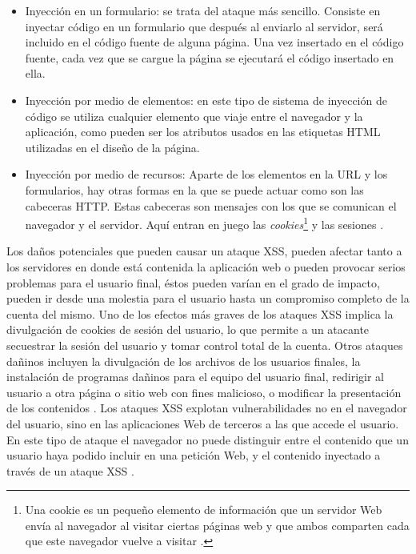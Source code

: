 \begin{itemize}
	\item Inyección en un formulario: se trata del ataque más sencillo. Consiste en inyectar código en un formulario que después al
enviarlo al servidor, será incluido en el código fuente de alguna página. Una vez insertado en el código fuente, cada vez
que se cargue la página se ejecutará el código insertado en ella.

	\item Inyección por medio de elementos: en este tipo de sistema de inyección de código se utiliza cualquier elemento que viaje
entre el navegador y la aplicación, como pueden ser los atributos usados en las etiquetas HTML utilizadas en el diseño de
la página.

	\item Inyección por medio de recursos: Aparte de los elementos en la URL y los formularios, hay otras formas en la que se
puede actuar como son las cabeceras HTTP. Estas cabeceras son mensajes con los que se comunican el navegador y el
servidor. Aquí entran en juego las \textit{cookies}\footnote{Una cookie es un pequeño elemento de información que un servidor Web envía al navegador al visitar ciertas páginas web y que ambos comparten cada que este navegador vuelve a visitar \cite{cookie}.} y las sesiones \cite{ocho}.\\
\end{itemize}

Los daños potenciales que pueden causar un ataque XSS, pueden afectar tanto a los servidores en donde está contenida la
aplicación web o pueden provocar serios problemas para el usuario final, éstos pueden varían en el grado de impacto, pueden ir
desde una molestia para el usuario hasta un compromiso completo de la cuenta del mismo. Uno de los efectos más graves de los
ataques XSS implica la divulgación de cookies de sesión del usuario, lo que permite a un atacante secuestrar la sesión del usuario y
tomar control total de la cuenta. Otros ataques dañinos incluyen la divulgación de los archivos de los usuarios finales, la instalación
de programas dañinos para el equipo del usuario final, redirigir al usuario a otra página o sitio web con fines malicioso, o modificar
la presentación de los contenidos \cite{nueve}. Los ataques XSS explotan vulnerabilidades no en el navegador del usuario, sino en las
aplicaciones Web de terceros a las que accede el usuario. En este tipo de ataque el navegador no puede distinguir entre el contenido
que un usuario haya podido incluir en una petición Web, y el contenido inyectado a través de un ataque XSS \cite{diez}.\\

